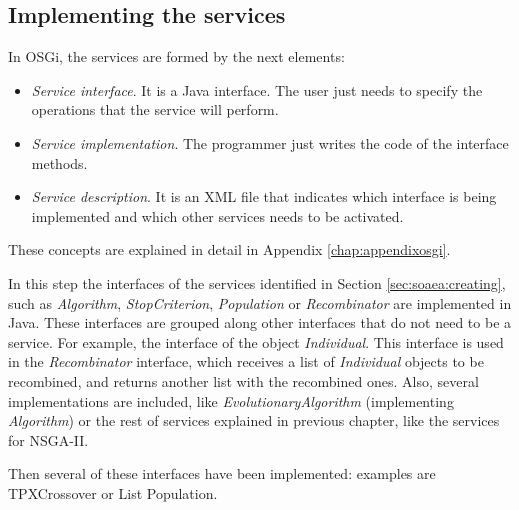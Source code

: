 
 
\subsection{Implementing the services}
\label{sec:osgiliath:implementing}

In OSGi, the services are formed by the next elements:

\begin{itemize}
\item {\em Service interface}. It is a Java interface. The user just needs to specify the operations that the service will perform.
\item {\em Service implementation}. The programmer just writes the code of the interface methods.
\item {\em Service description}. It is an XML file that indicates which
  interface is being implemented and which other services needs to be
  activated. 
\end{itemize}
These concepts are explained in detail in Appendix \ref{chap:appendixosgi}. %

In this step the interfaces of the services identified in
Section \ref{sec:soaea:creating}, such as {\em Algorithm}, {\em
  StopCriterion}, {\em Population} or {\em Recombinator} are implemented in Java. These
interfaces are grouped along other interfaces that do not need to be a
service. For example, the interface of the object {\em
  Individual}. This interface is used in the {\em Recombinator}
interface, which receives a list of {\em Individual} objects to be
recombined, and returns another list with the recombined ones. 
Also, several implementations are included, like {\em
  EvolutionaryAlgorithm} (implementing {\em  Algorithm}) or the rest
of  services explained in previous chapter, like the services for
NSGA-II. %

Then several of these interfaces have been implemented: examples are TPXCrossover or List Population.

